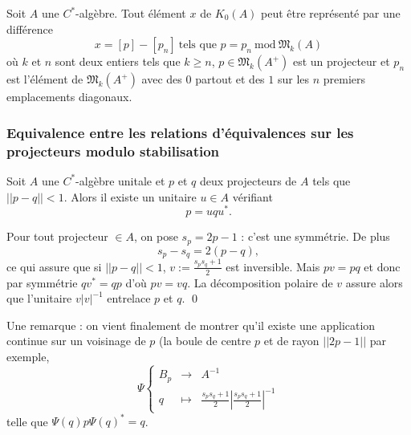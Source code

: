 \begin{prop}
Soit $A$ une $C^*$-algèbre. Tout élément $x$ de $K_0(A)$ peut être représenté par une différence
\[x=[p]-[p_n]\ \text{tels que } p = p_n \ \text{mod}\ \mathfrak M_k(A)\]
où $k$ et $n$ sont deux entiers tels que $k\geq n$, $p\in\mathfrak M_k(A^+)$ est un projecteur et $p_n$ est l'élément de $\mathfrak M_k(A^+)$ avec des $0$ partout et des $1$ sur les $n$ premiers emplacements diagonaux.
\end{prop}

\subsubsection{Equivalence entre les relations d'équivalences sur les projecteurs modulo stabilisation}
\begin{lem}\label{conj}
Soit $A$ une $C^*$-algèbre unitale et $p$ et $q$ deux projecteurs de $A$ tels que $||p-q||<1$. Alors il existe un unitaire $u\in A$ vérifiant
\[p=uqu^*.\]
\end{lem}

\begin{dem}
Pour tout projecteur $\in A$, on pose $s_p = 2p-1$ : c'est une symmétrie. De plus 
\[s_p-s_q = 2(p-q),\]
ce qui assure que si $||p-q||<1$, $v:= \frac{s_p s_q+1}{2}$ est inversible. Mais $pv=pq$ et donc par symmétrie $qv^* = qp$ d'où $pv=vq$. La décomposition polaire de $v$ assure alors que l'unitaire $v |v|^{-1}$ entrelace $p$ et $q$.
\qed\\
\end{dem}
Une remarque : on vient finalement de montrer qu'il existe une application continue sur un voisinage de $p$ (la boule de centre $p$ et de rayon $||2p-1||$ par exemple,
\[\Psi\left\{\begin{array}{rcl} B_p &\rightarrow & A^{-1} \\
 q & \mapsto &  \frac{s_p s_q +1}{2}|\frac{s_p s_q +1}{2}|^{-1}		
\end{array}\right.\]
telle que $\Psi(q) p \Psi(q)^* = q$. \\

